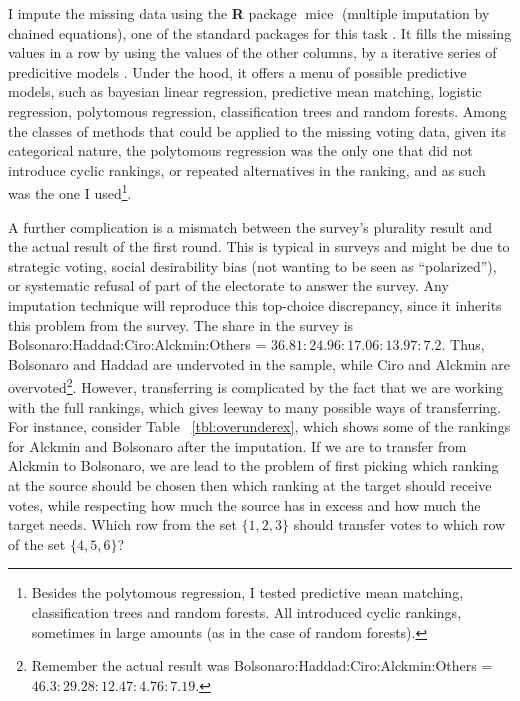 \documentclass[hidelinks,11pt]{article}
\begin{document}
I impute the missing data using the \textbf{\textsf{R}} package
\(\operatorname{mice}\) (multiple imputation by chained equations), one of the
standard packages for this task \parencite{van2011mice}. It fills the missing
values in a row by using the values of the other columns, by a iterative series
of predicitive models \parencite{vanbuuren2018imputation}. Under the hood, it
offers a menu of possible predictive models, such as bayesian linear regression,
predictive mean matching, logistic regression, polytomous regression,
classification trees and random forests. Among the classes of methods that could
be applied to the missing voting data, given its categorical nature, the
polytomous regression was the only one that did not introduce cyclic rankings,
or repeated alternatives in the ranking, and as such was the one I
used\footnote{Besides the polytomous regression, I tested predictive mean
  matching, classification trees and random forests. All introduced cyclic
  rankings, sometimes in large amounts (as in the case of random forests).}.

A further complication is a mismatch between the survey's plurality result and
the actual result of the first round. This is typical in surveys and might be
due to strategic voting, social desirability bias (not wanting to be seen as
``polarized''), or systematic refusal of part of the electorate to answer the
survey. Any imputation technique will reproduce this top-choice discrepancy,
since it inherits this problem from the survey. The share in the survey is
Bolsonaro:Haddad:Ciro:Alckmin:Others = \(36.81 : 24.96 : 17.06: 13.97 : 7.2 \).
Thus, Bolsonaro and Haddad are undervoted in the sample, while Ciro and Alckmin
are overvoted\footnote{Remember the actual result was
  Bolsonaro:Haddad:Ciro:Alckmin:Others =
  \(46.3 : 29.28 : 12.47 : 4.76 : 7.19 \).}. However, transferring is
complicated by the fact that we are working with the full rankings, which gives
leeway to many possible ways of transferring. For instance, consider Table
~\ref{tbl:overunderex}, which shows some of the rankings for Alckmin and
Bolsonaro after the imputation. If we are to transfer from Alckmin to Bolsonaro,
we are lead to the problem of first picking which ranking at the source should
be chosen then which ranking at the target should receive votes, while
respecting how much the source has in excess and how much the target needs.
Which row from the set \(\{1,2,3\}\) should transfer votes to which row of the
set \(\{4,5,6\}\)?
\end{document}
